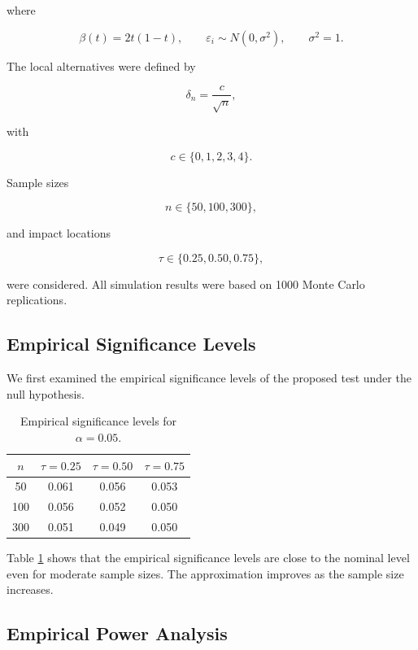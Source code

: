 \documentclass[twoside]{article}
\begin{document}
where

\[
\beta(t)=2t(1-t),
\qquad
\varepsilon_i\sim N(0,\sigma^2),
\qquad
\sigma^2=1.
\]

The local alternatives were defined by

\[
\delta_n=\frac{c}{\sqrt n},
\]

with

\[
c\in\{0,1,2,3,4\}.
\]

Sample sizes

\[
n\in\{50,100,300\},
\]

and impact locations

\[
\tau\in\{0.25,0.50,0.75\},
\]

were considered. All simulation results were based on 1000 Monte Carlo replications.


\subsection{Empirical Significance Levels}

We first examined the empirical significance levels of the proposed test under the null hypothesis.

\begin{table}[h]
	\begin{center}
		\small
		\caption{Empirical significance levels for $\alpha=0.05$.}\label{tab1}
		\begin{tabular}{|c|c|c|c|}
			\hline
			$n$ & $\tau=0.25$ & $\tau=0.50$ & $\tau=0.75$ \\ \hline \hline
			50  & 0.061 & 0.056 & 0.053 \\
			100 & 0.056 & 0.052 & 0.050 \\
			300 & 0.051 & 0.049 & 0.050 \\ \hline
		\end{tabular}
	\end{center}
\end{table}

Table \ref{tab1} shows that the empirical significance levels are close to the nominal level even for moderate sample sizes. The approximation improves as the sample size increases.


\subsection{Empirical Power Analysis}
\end{document}
